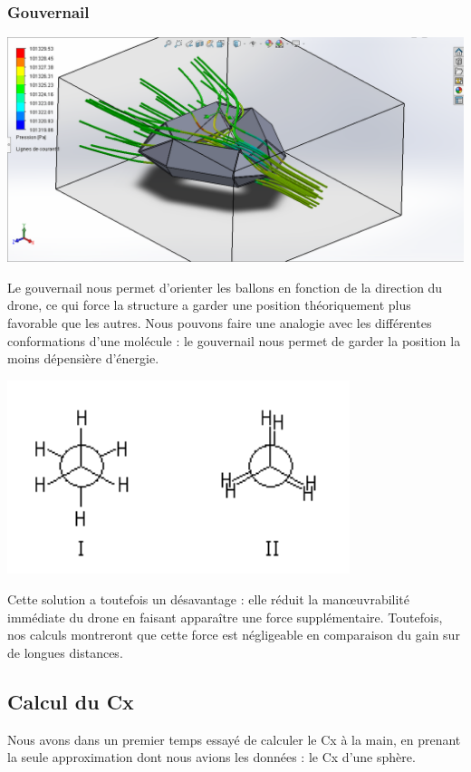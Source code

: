 \documentclass[a4paper,11pt]{article}
\begin{document}
\subsubsection{Gouvernail}
	\begin{center}
		\includegraphics[width=14cm]{../Images/Capture.PNG}
	\end{center}
	Le gouvernail nous permet d'orienter les ballons en fonction de la direction du drone, ce qui force la structure a garder une position théoriquement plus favorable que les autres.
	Nous pouvons faire une analogie avec les différentes conformations d'une molécule : le gouvernail nous permet de garder la position la moins dépensière d'énergie.\\
	\begin{center}
		\includegraphics[width=10cm]{../Images/conformations.png}
	\end{center}
  Cette solution a toutefois un désavantage : elle réduit la manœuvrabilité immédiate du drone en faisant apparaître une force supplémentaire. Toutefois, nos calculs montreront que cette force est négligeable en comparaison du gain sur de longues distances.

\subsection{Calcul du Cx}
	Nous avons dans un premier temps essayé de calculer le Cx à la main, en prenant la seule approximation dont nous avions les données : le Cx d'une sphère.
\end{document}

